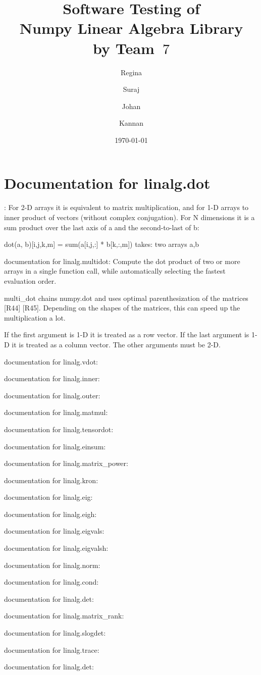 \documentclass[a4paper,11pt]{article}
\title{\textbf{Software Testing of \\ Numpy Linear Algebra Library\\
        by Team~$7$                                   %
}
}
\author{Regina \and Suraj \and Johan \and Kannan}  %
\date{\today}
\begin{document}
\section{Documentation for linalg.dot}:
For 2-D arrays it is equivalent to matrix multiplication, and for 1-D arrays to inner product of vectors (without complex conjugation). For N dimensions it is a sum product over the last axis of a and the second-to-last of b:

    dot(a, b)[i,j,k,m] = sum(a[i,j,:] * b[k,:,m])
    takes: two arrays a,b
    
documentation for linalg.multidot:
Compute the dot product of two or more arrays in a single function call, while automatically selecting the fastest evaluation order.

multi_dot chains numpy.dot and uses optimal parenthesization of the matrices [R44] [R45]. Depending on the shapes of the matrices, this can speed up the multiplication a lot.

If the first argument is 1-D it is treated as a row vector. If the last argument is 1-D it is treated as a column vector. The other arguments must be 2-D.


documentation for linalg.vdot:


documentation for linalg.inner:

documentation for linalg.outer:

documentation for linalg.matmul:

documentation for linalg.tensordot:

documentation for linalg.einsum:

documentation for linalg.matrix_power:

documentation for linalg.kron:

documentation for linalg.eig:

documentation for linalg.eigh:

documentation for linalg.eigvals:

documentation for linalg.eigvalsh:

documentation for linalg.norm:

documentation for linalg.cond:

documentation for linalg.det:

documentation for linalg.matrix_rank:

documentation for linalg.slogdet:
    
documentation for linalg.trace:

documentation for linalg.det:
\end{document}
